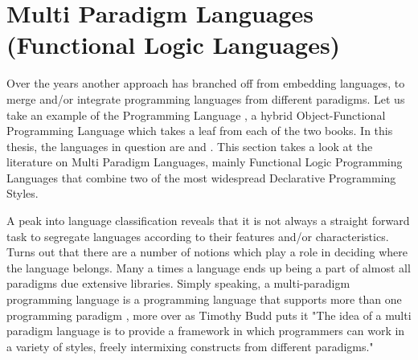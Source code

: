 \documentclass[proposal.tex]{subfiles}
\begin{document}
\chapter{Multi Paradigm Languages (Functional Logic Languages)}\label{chap:multiparadigm}

Over the years another approach has branched off from embedding languages, to merge and/or integrate programming 
languages from different paradigms. Let us take an example of the  Programming Language \cite{website:scala}, a 
hybrid Object-Functional Programming Language which takes a leaf from each of the two books. In this thesis, the languages in 
question are  and . This section takes a look at the literature on Multi Paradigm Languages, mainly Functional 
Logic Programming Languages that combine two of the most widespread Declarative Programming Styles.      

\par A peak into language classification reveals that it is not always a straight forward task to segregate languages according to their features and/or 
characteristics. Turns out that there are a number of notions which play a role in deciding where the language belongs. Many a times a language ends up 
being a part of almost all paradigms due extensive libraries. Simply speaking, a multi-paradigm programming language is a programming language that 
supports more than one programming paradigm \cite{Krishnamurthi:2008:TPL:1480828.1480846}, more over as Timothy Budd puts it 
\cite{website:wikimultiparadigm} "The idea of a multi paradigm language is to provide a framework in which programmers can work in a variety of styles, 
freely intermixing constructs from different paradigms."       



\begin{comment}
\subparagraph{}
In this section we talk about marrying or integrating the paradigms, multi paradigm programming language approach. Here we talk 
about combining the two most important and widely spread declarative paradigms, Functional and Logical Programming Paradigms. 
\end{comment}  
\end{document}
